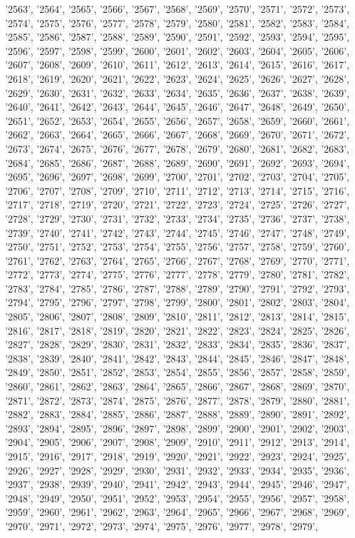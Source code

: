 '2563', '2564', '2565', '2566', '2567', '2568', '2569', '2570', '2571', '2572', '2573', '2574', '2575', '2576', '2577', '2578', '2579', '2580', '2581', '2582', '2583', '2584', '2585', '2586', '2587', '2588', '2589', '2590', '2591', '2592', '2593', '2594', '2595', '2596', '2597', '2598', '2599', '2600', '2601', '2602', '2603', '2604', '2605', '2606', '2607', '2608', '2609', '2610', '2611', '2612', '2613', '2614', '2615', '2616', '2617', '2618', '2619', '2620', '2621', '2622', '2623', '2624', '2625', '2626', '2627', '2628', '2629', '2630', '2631', '2632', '2633', '2634', '2635', '2636', '2637', '2638', '2639', '2640', '2641', '2642', '2643', '2644', '2645', '2646', '2647', '2648', '2649', '2650', '2651', '2652', '2653', '2654', '2655', '2656', '2657', '2658', '2659', '2660', '2661', '2662', '2663', '2664', '2665', '2666', '2667', '2668', '2669', '2670', '2671', '2672', '2673', '2674', '2675', '2676', '2677', '2678', '2679', '2680', '2681', '2682', '2683', '2684', '2685', '2686', '2687', '2688', '2689', '2690', '2691', '2692', '2693', '2694', '2695', '2696', '2697', '2698', '2699', '2700', '2701', '2702', '2703', '2704', '2705', '2706', '2707', '2708', '2709', '2710', '2711', '2712', '2713', '2714', '2715', '2716', '2717', '2718', '2719', '2720', '2721', '2722', '2723', '2724', '2725', '2726', '2727', '2728', '2729', '2730', '2731', '2732', '2733', '2734', '2735', '2736', '2737', '2738', '2739', '2740', '2741', '2742', '2743', '2744', '2745', '2746', '2747', '2748', '2749', '2750', '2751', '2752', '2753', '2754', '2755', '2756', '2757', '2758', '2759', '2760', '2761', '2762', '2763', '2764', '2765', '2766', '2767', '2768', '2769', '2770', '2771', '2772', '2773', '2774', '2775', '2776', '2777', '2778', '2779', '2780', '2781', '2782', '2783', '2784', '2785', '2786', '2787', '2788', '2789', '2790', '2791', '2792', '2793', '2794', '2795', '2796', '2797', '2798', '2799', '2800', '2801', '2802', '2803', '2804', '2805', '2806', '2807', '2808', '2809', '2810', '2811', '2812', '2813', '2814', '2815', '2816', '2817', '2818', '2819', '2820', '2821', '2822', '2823', '2824', '2825', '2826', '2827', '2828', '2829', '2830', '2831', '2832', '2833', '2834', '2835', '2836', '2837', '2838', '2839', '2840', '2841', '2842', '2843', '2844', '2845', '2846', '2847', '2848', '2849', '2850', '2851', '2852', '2853', '2854', '2855', '2856', '2857', '2858', '2859', '2860', '2861', '2862', '2863', '2864', '2865', '2866', '2867', '2868', '2869', '2870', '2871', '2872', '2873', '2874', '2875', '2876', '2877', '2878', '2879', '2880', '2881', '2882', '2883', '2884', '2885', '2886', '2887', '2888', '2889', '2890', '2891', '2892', '2893', '2894', '2895', '2896', '2897', '2898', '2899', '2900', '2901', '2902', '2903', '2904', '2905', '2906', '2907', '2908', '2909', '2910', '2911', '2912', '2913', '2914', '2915', '2916', '2917', '2918', '2919', '2920', '2921', '2922', '2923', '2924', '2925', '2926', '2927', '2928', '2929', '2930', '2931', '2932', '2933', '2934', '2935', '2936', '2937', '2938', '2939', '2940', '2941', '2942', '2943', '2944', '2945', '2946', '2947', '2948', '2949', '2950', '2951', '2952', '2953', '2954', '2955', '2956', '2957', '2958', '2959', '2960', '2961', '2962', '2963', '2964', '2965', '2966', '2967', '2968', '2969', '2970', '2971', '2972', '2973', '2974', '2975', '2976', '2977', '2978', '2979', 